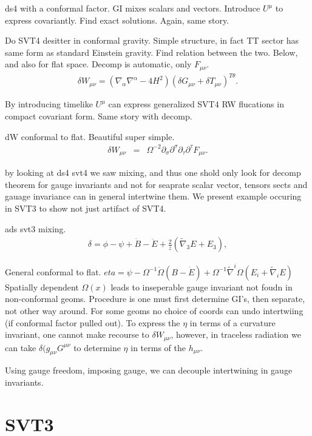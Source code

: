 ds4 with a conformal factor. GI mixes scalars and vectors. Introduce $U^\mu$ to express covariantly. Find exact solutions. Again, same story. 

Do SVT4 desitter in conformal gravity. Simple structure, in fact TT sector has same form as standard Einstein gravity. Find relation between the two. Below, and also for flat space. Decomp is automatic, only $F_{\mu\nu}$. 
\begin{eqnarray}
\delta W_{\mu\nu}=(\nabla_{\alpha}\nabla^{\alpha}-4H^2)(\delta G_{\mu\nu}+\delta T_{\mu\nu})^{T\theta}.
\end{eqnarray}

By introducing timelike $U^\mu$ can express generalized SVT4 RW flucations in compact covariant form. Same story with decomp. 

dW conformal to flat. Beautiful super simple. 
\begin{eqnarray}
\delta W_{\mu\nu}&=&\Omega^{-2}\partial_{\sigma}\partial^{\sigma}\partial_{\tau}\partial^{\tau}F_{\mu\nu}.
\end{eqnarray} 

by looking at ds4 svt4 we saw mixing, and thus one shold only look for decomp theorem for gauge invariants and not for seaprate scalar vector, tensors sects and gauage invariance can in general intertwine them. We present example occuring in SVT3 to show not just artifact of SVT4. 

ads svt3 mixing. 
\begin{eqnarray}
\delta = \phi -\psi + \dot B - \ddot E + \frac{2}{z}(\tilde\nabla_3 E + E_3),
\end{eqnarray}

General conformal to flat. $eta=\psi -\Omega^{-1}\dot{\Omega}(B-\dot E)+\Omega^{-1}\tilde\nabla^i\Omega(E_i+\tilde\nabla_i E)$ Spatially dependent $\Omega(x)$ leads to inseperable gauge invariant not foudn in non-conformal geoms. Procedure is one must first determine GI's, then separate, not other way around. For some geoms no choice of coords can undo intertwiing (if conformal factor pulled out). To express the $\eta$ in terms of a curvature invariant, one cannot make recourse to $\delta W_{\mu\nu}$, however, in traceless radiation we can take $\delta(g_{\mu\nu}G^{\mu\nu}$ to determine $\eta$ in terms of the $h_{\mu\nu}$. 

Using gauge freedom, imposing gauge, we can decouple intertwining in gauge invariants. 

\section{SVT3}
\label{s:svt3_construction}

